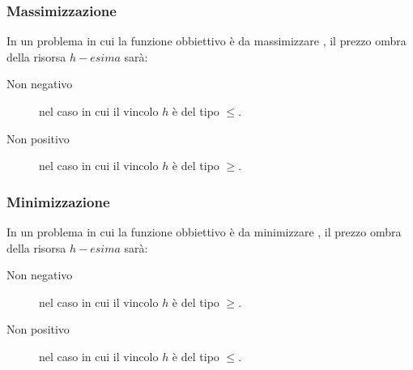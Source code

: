 \documentclass[\main/main.tex]{subfiles}
\begin{document}
\subsubsection{Massimizzazione}
In un problema in cui la funzione obbiettivo è da massimizzare , il prezzo ombra della risorsa $h-esima$ sarà:
\begin{description}
  \item[Non negativo] nel caso in cui il vincolo $h$ è del tipo $\leq$.
  \item[Non positivo] nel caso in cui il vincolo $h$ è del tipo $\geq$.
\end{description}

\subsubsection{Minimizzazione}
In un problema in cui la funzione obbiettivo è da minimizzare , il prezzo ombra della risorsa $h-esima$ sarà:
\begin{description}
  \item[Non negativo] nel caso in cui il vincolo $h$ è del tipo $\geq$.
  \item[Non positivo] nel caso in cui il vincolo $h$ è del tipo $\leq$.
\end{description}

\clearpage

\end{document}
